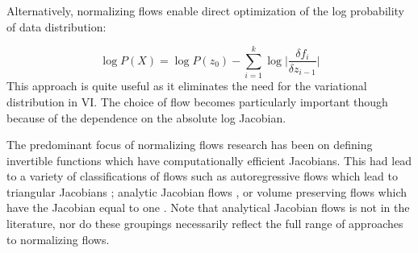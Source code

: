 Alternatively, normalizing flows enable direct optimization of the  log probability of  data distribution:
 
\begin{equation}
	\log P(X) = \log P(z_{0}) - \sum_{i=1}^{k} \log \bigg| \frac{\delta f_{i}}{\delta z_{i-1}} \bigg|
\end{equation}
This approach is quite useful as it eliminates the need for the variational distribution in \ac{VI}. The choice of flow becomes particularly important though because of the dependence on the absolute log Jacobian. %

The predominant focus of normalizing flows research has been on defining invertible functions which have computationally efficient Jacobians. This had lead to a variety of classifications of flows such as autoregressive flows which lead to triangular Jacobians \cite{kingma2016IAF, papamakarios2017MAF}; analytic Jacobian flows \cite{rezende2015VIwithNF,vdberg2018sylvester}, or volume preserving flows which have the Jacobian equal to one \cite{tomczak2016Householder,tran2019discreteflows,hoogeboom2019IntegerDiscreteFlows}. Note that analytical Jacobian flows is not in the literature, nor do these groupings necessarily reflect the full range of approaches to normalizing flows. 








